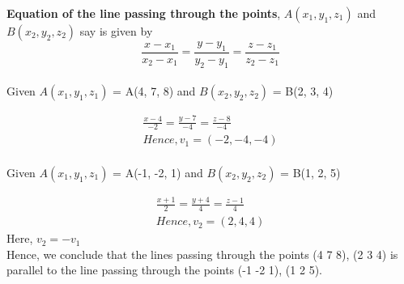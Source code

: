 \documentclass[a4paper,12pt]{article}
\begin{document}
\textbf{Equation of the line passing through the points}, $A(x_1, y_1, z_1)$ and $B(x_2, y_2, z_2)$ say is given by \\
\begin{equation}
 \frac{x - x_1}{x_2-x_1} = \frac{y - y_1}{y_2-y_1} = \frac{z - z_1}{z_2-z_1} 
\end{equation}
\\
Given $A(x_1, y_1, z_1)$ = A(4, 7, 8) and $B(x_2, y_2, z_2)$ = B(2, 3, 4)

\begin{align*}
 \frac{x - 4}{-2} = \frac{y - 7}{-4} = \frac{z - 8}{-4} \\
  Hence, v_1 = (-2, -4, -4)
\end{align*}
\\
Given $A(x_1, y_1, z_1)$ = A(-1, -2, 1) and $B(x_2, y_2, z_2)$ = B(1, 2, 5)

\begin{align*}
\frac{x + 1}{2} = \frac{y + 4}{4} = \frac{z - 1}{4} \\
Hence, v_2 = (2, 4, 4)
\end{align*}
Here, $v_2 = -v_1$ \\
Hence, we conclude that the lines passing through the points (4 7 8), (2 3 4) is parallel to the line passing through the points (-1 -2 1), (1 2 5).
\end{document}

